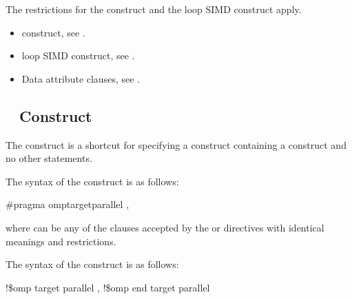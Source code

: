 \restrictions
The restrictions for the  construct and the loop SIMD construct apply.

\crossreferences
\begin{itemize}
\item {} construct, see 
.

\item loop SIMD construct, see 
.

\item Data attribute clauses, see 
. 
\end{itemize}









\subsection{~ Construct}
\label{subsec:target parallel Construct}
\summary
The   construct is a shortcut for specifying a  
construct containing a  construct and no other statements.

\syntax
\ccppspecificstart
The syntax of the   construct is as follows:

\begin{boxedcode}
\#pragma omp\plc{ }target\plc{ }parallel \plc{[clause[ [},\plc{] clause] ... ]}
\end{boxedcode}

where  can be any of the clauses accepted by the  or
 directives with identical meanings and restrictions.
\ccppspecificend

\begin{samepage}
\fortranspecificstart
The syntax of the   construct is as follows:

\begin{boxedcode}
!\$omp target parallel \plc{[clause[ [},\plc{] clause] ... ]}
!\$omp end target parallel
\end{boxedcode}
\end{samepage}

